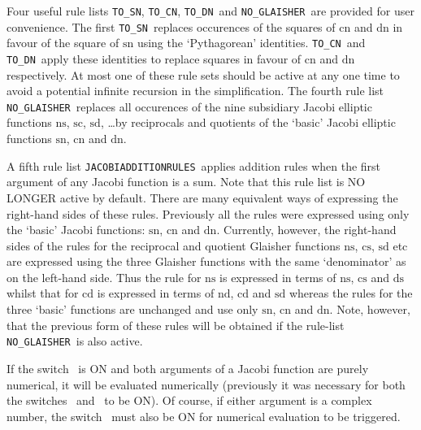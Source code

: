\hypertarget{reserved:TO_SN}{}
\hypertarget{reserved:TO_CN}{}
\hypertarget{reserved:TO_DN}{}
\hypertarget{reserved:NO_GLAISHER}{}
\hypertarget{reserved:JacobiAdditionRules}{}
Four useful rule lists \texttt{TO\_SN}, \texttt{TO\_CN}, \texttt{TO\_DN}\ and
\texttt{NO\_GLAISHER}\ are provided for user convenience. The first
\texttt{TO\_SN}\ replaces occurences of the squares of $\mathrm{cn}$ and
$\mathrm{dn}$ in favour of the square of $\mathrm{sn}$ using the
`Pythagorean' identities. \texttt{TO\_CN}\ and \texttt{TO\_DN}\ apply these
identities to replace squares in favour of $\mathrm{cn}$ and $\mathrm{dn}$
respectively. At most one of these rule sets should be active at any one time
to avoid a potential infinite recursion in the simplification.
The fourth rule list \texttt{NO\_GLAISHER}\ replaces all occurences of the
nine subsidiary Jacobi elliptic functions $\mathrm{ns}$, $\mathrm{sc}$,
$\mathrm{sd}$, \ldots by reciprocals and quotients of the `basic' Jacobi
elliptic functions $\mathrm{sn}$, $\mathrm{cn}$ and $\mathrm{dn}$.

A fifth rule list \texttt{JACOBIADDITIONRULES}\ applies addition rules when the
first argument of any Jacobi function is a sum.  Note that this rule list is NO
LONGER active by default. There are many equivalent ways of expressing the
right-hand sides of these rules. Previously all the rules were expressed using
only the `basic' Jacobi functions: $\mathrm{sn}$, $\mathrm{cn}$ and
$\mathrm{dn}$. Currently, however, the right-hand sides of the rules for the
reciprocal and quotient Glaisher functions $\mathrm{ns}$, $\mathrm{cs}$,
$\mathrm{sd}$ etc are expressed using the three Glaisher functions with
the same `denominator' as on the left-hand side. Thus the rule for $\mathrm{ns}$
is expressed in terms of $\mathrm{ns}$, $\mathrm{cs}$ and $\mathrm{ds}$
whilst that for $\mathrm{cd}$ is expressed in terms of $\mathrm{nd}$,
$\mathrm{cd}$ and $\mathrm{sd}$ whereas the rules for the three `basic'
functions are unchanged and use only $\mathrm{sn}$, $\mathrm{cn}$ and
$\mathrm{dn}$.  Note, however, that the previous form of these rules will be
obtained if the rule-list \texttt{NO\_GLAISHER}\ is also active.

If the switch \ is ON and both arguments of a Jacobi function are
purely numerical, it will be evaluated numerically (previously it was
necessary for both the switches \ and \ to be ON).
Of course, if either argument is a complex number, the switch \ must
also be ON for numerical evaluation to be triggered.

